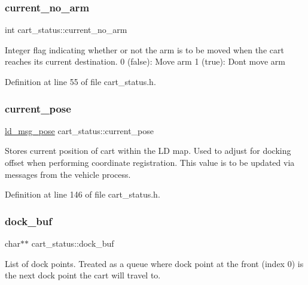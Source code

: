\subsubsection{\texorpdfstring{current\+\_\+no\+\_\+arm}{current\_no\_arm}}
{\footnotesize\ttfamily int cart\+\_\+status\+::current\+\_\+no\+\_\+arm\hspace{0.3cm}{\ttfamily [private]}}

Integer flag indicating whether or not the arm is to be moved when the cart reaches it\textquotesingle{}s current destination. 0 (false)\+: Move arm 1 (true)\+: Don\textquotesingle{}t move arm 

Definition at line 55 of file cart\+\_\+status.\+h.

\mbox{\label{classcart__status_a5fe1250a34605ce2bea020047eb71223}} 
\subsubsection{\texorpdfstring{current\+\_\+pose}{current\_pose}}
{\footnotesize\ttfamily \mbox{\hyperlink{structld__msg__pose}{ld\+\_\+msg\+\_\+pose}} cart\+\_\+status\+::current\+\_\+pose\hspace{0.3cm}{\ttfamily [private]}}

Stores current position of cart within the LD map. Used to adjust for docking offset when performing coordinate registration. This value is to be updated via messages from the vehicle process. 

Definition at line 146 of file cart\+\_\+status.\+h.

\mbox{\label{classcart__status_a8f3151213022c1aab59d0c0dae5e4b4c}} 
\subsubsection{\texorpdfstring{dock\+\_\+buf}{dock\_buf}}
{\footnotesize\ttfamily char$\ast$$\ast$ cart\+\_\+status\+::dock\+\_\+buf\hspace{0.3cm}{\ttfamily [private]}}

List of dock points. Treated as a queue where dock point at the front (index 0) is the next dock point the cart will travel to. 

